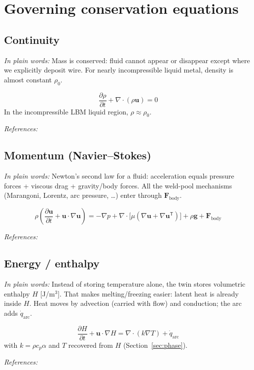 \documentclass[11pt,a4paper]{article}
\newcommand{\vect}[1]{\mathbf{#1}}
\newcommand{\fref}[1]{\par\smallskip\noindent\textit{References:} #1\par}
\newcommand{\newbie}[1]{\par\medskip\noindent\textit{In plain words:} #1\par\medskip}
\begin{document}
\section{Governing conservation equations}

\subsection{Continuity}
\newbie{Mass is conserved: fluid cannot appear or disappear except where we
explicitly deposit wire. For nearly incompressible liquid metal, density is
almost constant $\rho_0$.}

\begin{equation}
  \frac{\partial \rho}{\partial t} + \nabla\cdot(\rho\vect{u}) = 0
\end{equation}
In the incompressible LBM liquid region, $\rho \approx \rho_0$.
\fref{\cite{Batchelor1967,Kruger2017}}

\subsection{Momentum (Navier--Stokes)}
\newbie{Newton's second law for a fluid: acceleration equals pressure forces +
viscous drag + gravity/body forces. All the weld-pool mechanisms (Marangoni,
Lorentz, arc pressure, \ldots) enter through $\vect{F}_{\mathrm{body}}$.}

\begin{equation}
  \rho\left(\frac{\partial \vect{u}}{\partial t} + \vect{u}\cdot\nabla\vect{u}\right)
  = -\nabla p + \nabla\cdot\bigl[\mu(\nabla\vect{u} + \nabla\vect{u}^{\mathsf T})\bigr]
  + \rho\vect{g} + \vect{F}_{\mathrm{body}}
  \label{eq:ns}
\end{equation}
\fref{\cite{Oreper1984,Kou2003,Incropera2007}}

\subsection{Energy / enthalpy}
\label{sec:energy}
\newbie{Instead of storing temperature alone, the twin stores volumetric enthalpy
$H$ [J/m$^3$]. That makes melting/freezing easier: latent heat is already inside
$H$. Heat moves by advection (carried with flow) and conduction; the arc adds
$\dot{q}_{\mathrm{arc}}$.}

\begin{equation}
  \frac{\partial H}{\partial t} + \vect{u}\cdot\nabla H = \nabla\cdot(k\nabla T) + \dot{q}_{\mathrm{arc}}
  \label{eq:enthalpy-transport}
\end{equation}
with $k = \rho c_p \alpha$ and $T$ recovered from $H$ (Section~\ref{sec:phase}).
\fref{\cite{Voller1987,Incropera2007,Brent1988}}
\end{document}

